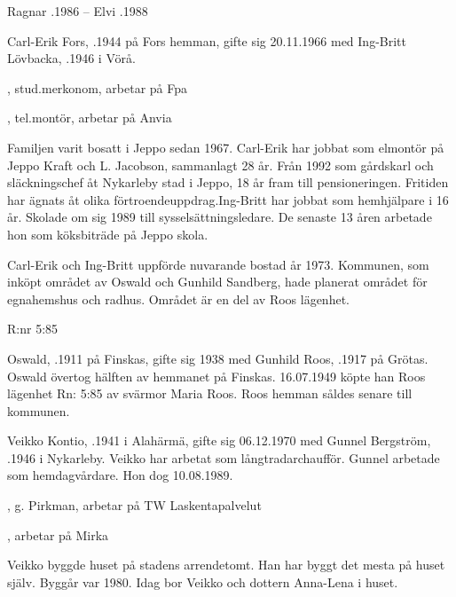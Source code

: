 Ragnar .1986  --  Elvi .1988




Carl-Erik Fors, .1944 på Fors hemman, gifte sig 20.11.1966 med Ing-Britt Lövbacka, .1946 i Vörå.
\begin{jhchildren}
  \item {}, stud.merkonom, arbetar på Fpa
  \item {}, tel.montör, arbetar på Anvia
\end{jhchildren}
Familjen varit bosatt i Jeppo sedan 1967. Carl-Erik har jobbat som elmontör på Jeppo Kraft och L. Jacobson, sammanlagt 28 år. Från 1992 som gårdskarl och släckningschef åt Nykarleby stad i Jeppo, 18 år fram till pensioneringen. Fritiden har ägnats åt olika förtroendeuppdrag.Ing-Britt har jobbat som hemhjälpare i 16 år. Skolade om sig 1989 till sysselsättningsledare. De senaste 13 åren arbetade hon som köksbiträde på Jeppo skola.

Carl-Erik och Ing-Britt uppförde nuvarande bostad år 1973. Kommunen, som inköpt området av Oswald och Gunhild Sandberg,
hade planerat området för egnahemshus och radhus. Området är en del av Roos lägenhet.


  		R:nr 5:85


Oswald, .1911 på Finskas, gifte sig 1938 med Gunhild Roos, .1917 på Grötas. Oswald övertog hälften av hemmanet på Finskas. 16.07.1949 köpte han Roos lägenhet Rn: 5:85 av svärmor Maria Roos. Roos hemman såldes senare till kommunen.




Veikko Kontio, .1941 i Alahärmä, gifte sig 06.12.1970 med Gunnel Bergström, .1946 i Nykarleby. Veikko har arbetat som långtradarchaufför. Gunnel arbetade som hemdagvårdare. Hon dog 10.08.1989.

\begin{jhchildren}
  \item {},  g. Pirkman, arbetar på TW Laskentapalvelut
  \item {}, arbetar på Mirka
\end{jhchildren}
Veikko byggde huset på stadens arrendetomt. Han har byggt det mesta på huset själv. Byggår var 1980. Idag bor Veikko och dottern Anna-Lena i huset.



